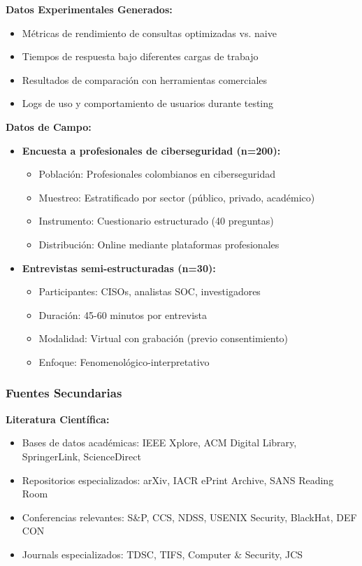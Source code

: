 \textbf{Datos Experimentales Generados:}
\begin{itemize}
    \item Métricas de rendimiento de consultas optimizadas vs. naive
    \item Tiempos de respuesta bajo diferentes cargas de trabajo
    \item Resultados de comparación con herramientas comerciales
    \item Logs de uso y comportamiento de usuarios durante testing
\end{itemize}

\textbf{Datos de Campo:}
\begin{itemize}
    \item \textbf{Encuesta a profesionales de ciberseguridad (n=200):}
    \begin{itemize}
        \item Población: Profesionales colombianos en ciberseguridad
        \item Muestreo: Estratificado por sector (público, privado, académico)
        \item Instrumento: Cuestionario estructurado (40 preguntas)
        \item Distribución: Online mediante plataformas profesionales
    \end{itemize}
    
    \item \textbf{Entrevistas semi-estructuradas (n=30):}
    \begin{itemize}
        \item Participantes: CISOs, analistas SOC, investigadores
        \item Duración: 45-60 minutos por entrevista
        \item Modalidad: Virtual con grabación (previo consentimiento)
        \item Enfoque: Fenomenológico-interpretativo
    \end{itemize}
\end{itemize}

\subsubsection{Fuentes Secundarias}

\textbf{Literatura Científica:}
\begin{itemize}
    \item Bases de datos académicas: IEEE Xplore, ACM Digital Library, SpringerLink, ScienceDirect
    \item Repositorios especializados: arXiv, IACR ePrint Archive, SANS Reading Room
    \item Conferencias relevantes: S\&P, CCS, NDSS, USENIX Security, BlackHat, DEF CON
    \item Journals especializados: TDSC, TIFS, Computer \& Security, JCS
\end{itemize}

